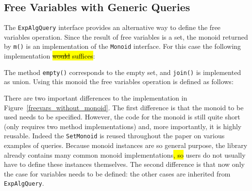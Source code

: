\subsection{Free Variables with Generic Queries}\label{subsec:solvingfreevars}


The \lstinline{ExpAlgQuery} interface provides an alternative way to
define the free variables operation.  Since the result of free
variables is a set, the monoid returned by \lstinline{m()} is an
implementation of the \lstinline{Monoid} interface. For this case the following implementation \hl{\sout{would} suffices}:


\noindent The method
\lstinline{empty()} corresponds to the empty set, and
\lstinline{join()} is implemented as union.  Using this monoid the
free variables operation is defined as follows:



\noindent There are two important differences to the implementation in
Figure~\ref{freevars_without_monoid}. The first difference is that the monoid to be used
needs to be specified. However, the code for the monoid is still
quite short (only requires two method implementations) and, more importantly,
it is highly reusable. Indeed the \lstinline{SetMonoid} is reused
throughout the paper on various examples of queries.
Because monoid instances are so general purpose, the \name library
already contains many common monoid implementations\hl{, so} users do not
usually have to
define these instances themselves.
The second difference is that now only the case for variables needs to
be defined: the other cases are inherited from
\lstinline{ExpAlgQuery}.

